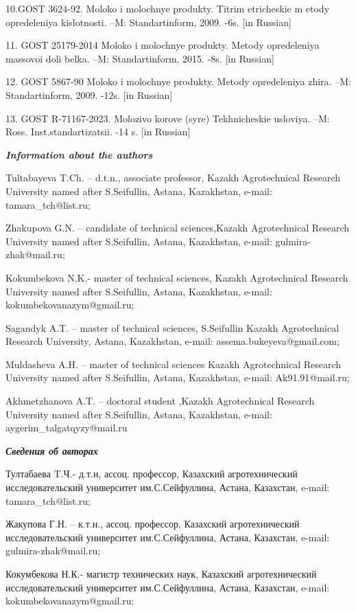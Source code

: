 10.GOST 3624-92. Moloko i molochnye produkty. Titrim etricheskie m etody
opredeleniya kislotnosti. --M: Standartinform, 2009. -6s. {[}in
Russian{]}

11. GOST 25179-2014 Moloko i molochnye produkty. Metody opredeleniya
massovoi doli belka. --M: Standartinform, 2015. -8s. {[}in Russian{]}

12. GOST 5867-90 Moloko i molochnye produkty. Metody opredeleniya zhira.
--M: Standartinform, 2009. -12s. {[}in Russian{]}

13. GOST R-71167-2023. Molozivo korov\textquotesingle\textquotesingle e
(syr\textquotesingle\textquotesingle e) Tekhnicheskie usloviya. --M:
Ross. Inst.standartizatsii. -14 s. {[}in Russian{]}

\emph{{\bfseries Information about the authors}}

Tultabayeva T.Ch. -- d.t.n., associate professor, Kazakh Agrotechnical
Research University named after S.Seifullin, Astana, Kazakhstan, e-mail:
tamara\_tch@list.ru;

Zhakupova G.N. -- candidate of technical sciences,Kazakh Agrotechnical
Research University named after S.Seifullin, Astana, Kazakhstan, e-mail:
gulmira-zhak@mail.ru;

Kokumbekova N.K.- master of technical sciences, Kazakh Agrotechnical
Research University named after S.Seifullin, Astana, Kazakhstan, e-mail:
kokumbekovanazym@gmail.ru;

Sagandyk A.T. -- master of technical sciences, S.Seifullin Kazakh
Agrotechnical Research University, Astana, Kazakhstan, e-mail:
assema.bukeyeva@gmail.com;

Muldasheva A.H. -- master of technical sciences Kazakh Agrotechnical
Research University named after S.Seifullin, Astana, Kazakhstan, e-mail:
Ak91.91@mail.ru;

Akhmetzhanova A.T. -- doctoral student ,Kazakh Agrotechnical Research
University named after S.Seifullin, Astana, Kazakhstan, e-mail:
aygerim\_talgatqyzy@mail.ru

\emph{{\bfseries Сведения об авторах}}

Тултабаева T.Ч.- д.т.н, ассоц. профессор, Казахский агротехнический
исследовательский университет им.С.Сейфуллина, Астана, Казахстан,
e-mail: tamara\_tch@list.ru;

Жакупова Г.Н. -- к.т.н., ассоц. профессор, Казахский агротехнический
исследовательский университет им.С.Сейфуллина, Астана, Казахстан,
e-mail: gulmira-zhak@mail.ru;

Кокумбекова Н.К.- магистр технических наук, Казахский агротехнический
исследовательский университет им.С.Сейфуллина, Астана, Казахстан,
e-mail: kokumbekovanazym@gmail.ru;

